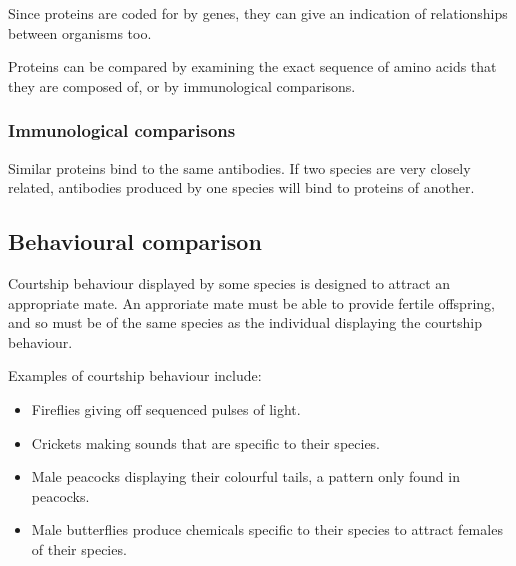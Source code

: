 \documentclass{article}
\begin{document}
Since proteins are coded for by genes, they can give an indication of
relationships between organisms too.

Proteins can be compared by examining the exact sequence of amino acids that
they are composed of, or by immunological comparisons.

\subsubsection*{Immunological comparisons}

Similar proteins bind to the same antibodies. If two species are very closely
related, antibodies produced by one species will bind to proteins of another.

\subsection*{Behavioural comparison}

Courtship behaviour displayed by some species is designed to attract an
appropriate mate. An approriate mate must be able to provide fertile offspring,
and so must be of the same species as the individual displaying the courtship
behaviour.

Examples of courtship behaviour include:

\begin{itemize}

	\item Fireflies giving off sequenced pulses of light.

	\item Crickets making sounds that are specific to their species.

	\item Male peacocks displaying their colourful tails, a pattern only found
	in peacocks.

	\item Male butterflies produce chemicals specific to their species to
	attract females of their species.

\end{itemize}
\end{document}
